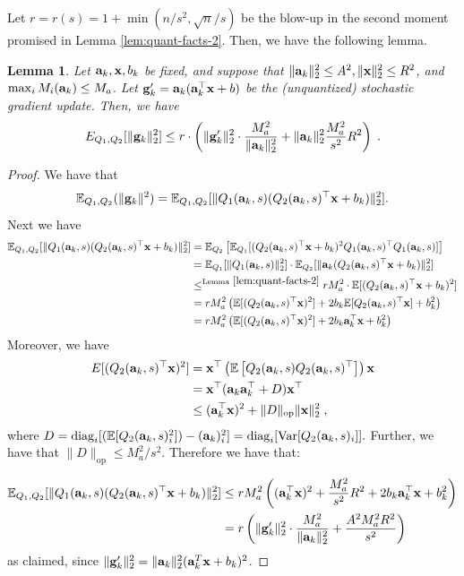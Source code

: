 \documentclass{article}
\renewcommand{\vec}[1]{\mathbf{#1}}
\def\a{{\bf a}}
\def\g{{\bf g}}
\def\x{{\bf x}}
\def\E{\mathbb{E}}
\newtheorem{lemma}{Lemma}
\begin{document}
Let $r = r(s) = 1 + \min (n / s^2, \sqrt{n}/ s)$ be the blow-up in the second moment promised in Lemma \ref{lem:quant-facts-2}.
Then, we have the following lemma.
\begin{lemma}
    Let $\a_k, \x, b_k$ be fixed, and suppose that $\| \a_k \|_2^2 \leq A^2, \| \x \|_2^2 \leq R^2$, and $\max_i M_i (\a_k) \leq M_a$.
    Let $\g'_k = \a_k (\a_k^\top \x + b)$ be the (unquantized) stochastic gradient update.
    Then, we have 
    \[
    E_{Q_1, Q_2} [\| \g_k \|_2^2] \leq r \cdot \left( \| \g'_k \|_2^2 \cdot \frac{M_a^2}{\| \a_k \|_2^2} + \| \a_k \|_2^2 \frac{M_a^2}{s^2} R^2 \right)\; .
    \]
\end{lemma}
\begin{proof}
We have that 
\[
\E_{Q_1, Q_2}(\|\g_k\|^2) = \E_{Q_1, Q_2} [\| Q_1 (\a_k, s) (Q_2 (\a_k, s)^\top \x + b_k) \|_2^2].
\]
Next we have
\begin{align*}
    \E_{Q_1, Q_2} [\| Q_1 (\a_k, s) (Q_2 (\a_k, s)^\top \x + b_k) \|_2^2] &= \E_{Q_2} \left[ \E_{Q_1} [ (Q_2 (\a_k, s)^\top \x + b_k)^2 Q_1 (\a_k, s)^\top Q_1 (\a_k, s)] \right] \\
    &= \E_{Q_1}[ \| Q_1( \vec{a}_k, s) \|_2^2 ] \cdot \E_{Q_2} [\| \a_k (Q_2 (\a_k, s)^\top \x + b_k)\|_2^2 ] \\
    &\leq^{\mathrm{Lemma}~\ref{lem:quant-facts-2}} r M_a^2 \cdot \E [(Q_2 (\a_k, s)^\top \x + b_k)^2 ] \\
    &= r M_a^2 \left( \E [(Q_2 (\a_k, s)^\top \x)^2] + 2 b_k \E [Q_2 (\a_k, s)^\top \x] + b_k^2 \right) \\
    &= r M_a^2 \left( \E [(Q_2 (\a_k, s)^\top \x)^2] + 2 b_k \a_k^\top \x + b_k^2 \right)
\end{align*}
Moreover, we have
\begin{align*}
    E [(Q_2 (\a_k, s)^\top \x)^2] &= \x^\top \left( \E \left[ Q_2 (\a_k, s) Q_2 (\a_k, s)^\top \right] \right) \x \\
    &= \x^\top (\a_k \a_k^\top + D) \x^\top \\
    &\leq (\a_k^\top \x)^2 + \| D \|_{\mathrm{op}} \| \x \|_2^2 \; ,
\end{align*}
where $D = \mathrm{diag}_i [ (\E[Q_2 (\a_k, s)_i^2]) - (\a_k)_i^2 ] =\mathrm{diag}_i [ \mathrm{Var} [Q_2 (\a_k, s)_i] ].$ Further, we have that $\| D \|_{\mathrm{op}}  \leq M_a^2 / s^2$.
Therefore we have that:

\begin{align*}
     \E_{Q_1, Q_2} [\| Q_1 (\a_k, s) (Q_2 (\a_k, s)^\top \x + b_k) \|_2^2]  &\leq r M_a^2 \left( (\a_k^\top \x)^2 + \frac{M_a^2}{s^2} R^2 + 2 b_k \a_k^\top \x + b_k^2  \right) \\
    &= r \left( \| \g'_k \|_2^2 \cdot \frac{M_a^2}{\| \a_k \|_2^2} + \frac{A^2 M_a^2 R^2}{s^2} \right) \,
\end{align*}
as claimed, since $\| \g'_k \|_2^2 = \| \a_k \|_2^2 (\a_k^T \x + b_k)^2$.
\end{proof}
\end{document}
